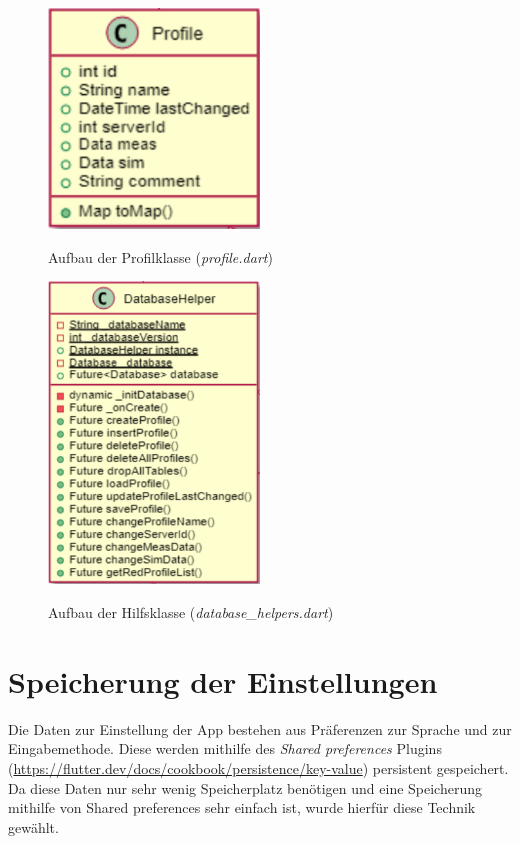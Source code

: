 	\begin{figure}[H]
		\centering
		\includegraphics[width=0.5\textwidth]{../include/images/techdoc/profileClass}
		\label{img:commentTextfield}
		\caption{Aufbau der Profilklasse (\textit{profile.dart})}
	\end{figure}

	\begin{figure}[H]
		\centering
		\includegraphics[width=0.5\textwidth]{../include/images/techdoc/dbHelperClass}
		\label{img:commentTextfield}
		\caption{Aufbau der Hilfsklasse (\textit{database\_helpers.dart})}
	\end{figure}

	
	\section{Speicherung der Einstellungen}
	\label{sec:speicherungEinstellungen}
	
	Die Daten zur Einstellung der App bestehen aus Präferenzen zur Sprache und zur Eingabemethode. Diese werden mithilfe des \textit{Shared preferences} Plugins (\url{https://flutter.dev/docs/cookbook/persistence/key-value}) persistent gespeichert. Da diese Daten nur sehr wenig Speicherplatz benötigen und eine Speicherung mithilfe von Shared preferences sehr einfach ist, wurde hierfür diese Technik gewählt.
	
